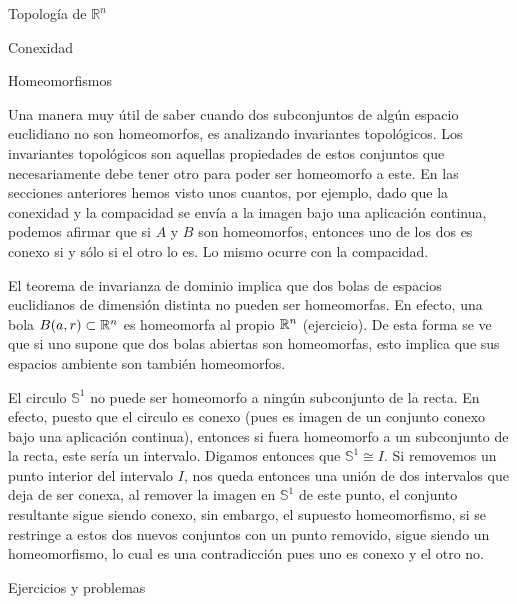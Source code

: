 \begin{chapter}{Topología de $\mathbb{R}^n$}
\begin{section}{Conexidad}
\begin{section}{Homeomorfismos}
\begin{them}
\end{them}

Una manera muy útil de saber cuando dos subconjuntos de algún espacio euclidiano no son homeomorfos, es analizando invariantes topológicos. Los invariantes topológicos son aquellas propiedades de estos conjuntos que necesariamente debe tener otro para poder ser homeomorfo a este. En las secciones anteriores hemos visto unos cuantos, por ejemplo, dado que la conexidad y la compacidad se envía a la imagen bajo una aplicación continua, podemos afirmar que si $A$ y $B$ son homeomorfos, entonces uno de los dos es conexo si y sólo si el otro lo es. Lo mismo ocurre con la compacidad.

\begin{exmp}
    El teorema de invarianza de dominio implica que dos bolas de espacios euclidianos de dimensión distinta no pueden ser homeomorfas. En efecto, una bola $B(a,r) \subset \mathbb{R}^n$ es homeomorfa al propio $\mathbb{R}^n$ (ejercicio). De esta forma se ve que si uno supone que dos bolas abiertas son homeomorfas, esto implica que sus espacios ambiente son también homeomorfos.
\end{exmp}

\begin{exmp}

El circulo $\mathbb{S}^1$ no puede ser homeomorfo a ningún subconjunto de la recta. En efecto, puesto que el circulo es conexo (pues es imagen de un conjunto conexo bajo una aplicación continua), entonces si fuera homeomorfo a un subconjunto de la recta, este sería un intervalo. Digamos entonces que $\mathbb{S}^1 \cong I$. Si removemos un punto interior del intervalo $I$, nos queda entonces una unión de dos intervalos que deja de ser conexa, al remover la imagen en $\mathbb{S}^1$ de este punto, el conjunto resultante sigue siendo conexo, sin embargo, el supuesto homeomorfismo, si se restringe a estos dos nuevos conjuntos con un punto removido, sigue siendo un homeomorfismo, lo cual es una contradicción pues uno es conexo y el otro no.

\end{exmp}


\end{section}

\end{section}

\begin{section}{Ejercicios y problemas}


\end{section}
\end{chapter}
